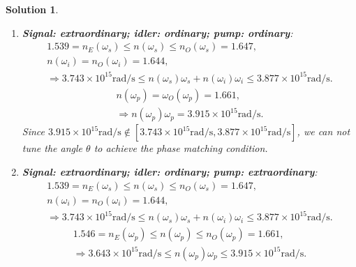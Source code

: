 \documentclass[UTF8,10pt,a4paper]{article}
\theoremstyle{Problem}
\theoremstyle{Solution}
\newtheorem*{sol}{Solution}
\begin{document}
\begin{sol}
\begin{enumerate}
\begin{enumerate}
            Under this combination of the input and the output polarization direction, the effective nonlinearity is
            \begin{align}
                d_{eoe}=d_{22}\cos^2\theta\cos 3\phi,
            \end{align}
            and its maximum is
            \begin{align}
                (d_{eoe})_{\max}=d_{oee}(\theta=0.4912,\phi=\frac{(2m+1)\pi}{6},m\in\mathbb{Z})=1.726\text{pm}/\text{V}.
            \end{align}
            \item \textbf{Signal: extraordinary; idler: ordinary; pump: ordinary}:
            \begin{gather}
                1.539=n_E(\omega_s)\leq n(\omega_s)\leq n_O(\omega_s)=1.647,\\
                n(\omega_i)=n_O(\omega_i)=1.644,\\
                \Longrightarrow 3.743\times 10^{15}\text{rad}/\text{s}\leq n(\omega_s)\omega_s+n(\omega_i)\omega_i\leq 3.877\times 10^{15}\text{rad}/\text{s}.
            \end{gather}
            \begin{gather}
                n(\omega_p)=\omega_O(\omega_p)=1.661,\\
                \Longrightarrow n(\omega_p)\omega_p=3.915\times 10^{15}\text{rad}/\text{s}.
            \end{gather}
            Since $3.915\times 10^{15}\text{rad}/\text{s}\notin[3.743\times 10^{15}\text{rad}/\text{s},3.877\times 10^{15}\text{rad}/\text{s}]$, we can not tune the angle $\theta$ to achieve the phase matching condition.
            \item \textbf{Signal: extraordinary; idler: ordinary; pump: extraordinary}:
            \begin{gather}
                1.539=n_E(\omega_s)\leq n(\omega_s)\leq n_O(\omega_s)=1.647,\\
                n(\omega_i)=n_O(\omega_i)=1.644,\\
                \Longrightarrow 3.743\times 10^{15}\text{rad}/\text{s}\leq n(\omega_s)\omega_s+n(\omega_i)\omega_i\leq 3.877\times 10^{15}\text{rad}/\text{s}.
            \end{gather}
            \begin{gather}
                1.546=n_E(\omega_p)\leq n(\omega_p)\leq n_O(\omega_p)=1.661,\\
                \Longrightarrow 3.643\times 10^{15}\text{rad}/\text{s}\leq n(\omega_p)\omega_p\leq 3.915\times 10^{15}\text{rad}/\text{s}.

\end{gather}
\end{enumerate}
\end{enumerate}
\end{sol}
\end{document}
